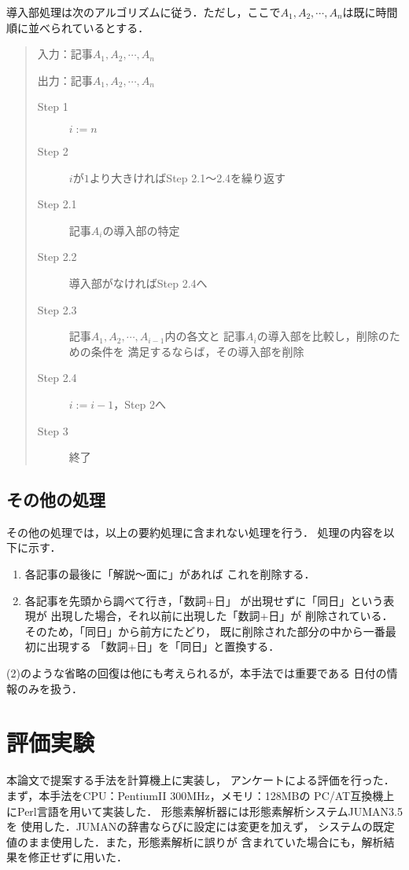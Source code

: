導入部処理は次のアルゴリズムに従う．ただし，ここで$A_1, A_2, 
\cdots , A_n$は既に時間順に並べられているとする．
\begin{quote}
 入力：記事$A_1, A_2, \cdots ,A_n$

 出力：記事$A_1, A_2, \cdots ,A_n$

\begin{description}
 \item[Step 1] $i:=n$
 \item[Step 2] $i$が$1$より大きければStep 2.1〜2.4を繰り返す
 \item[Step 2.1] 記事$A_i$の導入部の特定
 \item[Step 2.2] 導入部がなければStep 2.4へ
 \item[Step 2.3] 記事$A_1, A_2, \cdots , A_{i-1}$内の各文と
	    記事$A_i$の導入部を比較し，削除のための条件を
	    満足するならば，その導入部を削除
 \item[Step 2.4] $i:=i-1$，Step 2へ
 \item[Step 3] 終了
\end{description} 
\end{quote}

\subsection{その他の処理}
その他の処理では，以上の要約処理に含まれない処理を行う．
処理の内容を以下に示す．

\begin{enumerate}
 \item 各記事の最後に「解説〜面に」があれば
       これを削除する．
 \item 各記事を先頭から調べて行き，「数詞+日」
       が出現せずに「同日」という表現が
       出現した場合，それ以前に出現した「数詞+日」が
       削除されている．そのため，「同日」から前方にたどり，
       既に削除された部分の中から一番最初に出現する
       「数詞+日」を「同日」と置換する．
\end{enumerate}

(2)のような省略の回復は他にも考えられるが，本手法では重要である
日付の情報のみを扱う．

\section{評価実験}
\label{評価実験}

本論文で提案する手法を計算機上に実装し，
アンケートによる評価を行った．
まず，本手法をCPU：PentiumII 300MHz，メモリ：128MBの
PC/AT互換機上にPerl言語を用いて実装した．
形態素解析器には形態素解析システムJUMAN3.5を
使用した．JUMANの辞書ならびに設定には変更を加えず，
システムの既定値のまま使用した．また，形態素解析に誤りが
含まれていた場合にも，解析結果を修正せずに用いた．

